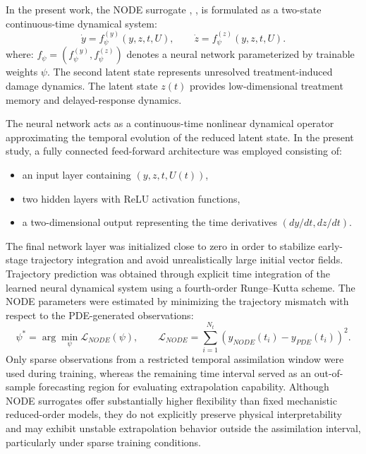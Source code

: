 In the present work, the NODE surrogate \cite{chen2018neural}, \cite{rackauckas2020ude}, \cite{rubanova2019latent} is formulated as a two-state
continuous-time dynamical system:
\begin{equation}
\label{eq:node}
\dot y=f_{\psi}^{(y)}(y,z,t,U),
\qquad
\dot z=f_{\psi}^{(z)}(y,z,t,U).
\end{equation}
where:
\(f_{\psi}=(f_{\psi}^{(y)},f_{\psi}^{(z)})\) denotes a neural network
parameterized by trainable weights \(\psi\). The second latent state represents unresolved treatment-induced damage dynamics.
The latent state $z(t)$ provides low-dimensional treatment memory and delayed-response dynamics.

The neural network acts as a continuous-time nonlinear dynamical
operator approximating the temporal evolution of the reduced latent
state. In the present study, a fully connected feed-forward
architecture was employed consisting of:
\begin{itemize}
\item
an input layer containing $(y,z,t,U(t))$,
\item
two hidden layers with ReLU activation functions,
\item
a two-dimensional output representing the time derivatives $(dy/dt,dz/dt)$.
\end{itemize}
The final network layer was initialized close to zero in order to
stabilize early-stage trajectory integration and avoid unrealistically
large initial vector fields. Trajectory prediction was obtained through explicit time integration of
the learned neural dynamical system using a fourth-order Runge--Kutta
scheme. The NODE parameters were estimated by minimizing the trajectory mismatch
with respect to the PDE-generated observations:
\begin{equation}
\label{eq:node_training}
\psi^{*}
=
\arg\min_{\psi}
\mathcal{L}_{NODE}(\psi),
\qquad
\mathcal{L}_{NODE}
=
\sum_{i=1}^{N_t}
\left(
y_{NODE}(t_i)
-
y_{PDE}(t_i)
\right)^2.
\end{equation}
Only sparse observations from a restricted temporal assimilation window
were used during training, whereas the remaining time interval served as
an out-of-sample forecasting region for evaluating extrapolation
capability.
Although NODE surrogates offer substantially higher flexibility than
fixed mechanistic reduced-order models, they do not explicitly preserve
physical interpretability and may exhibit unstable extrapolation
behavior outside the assimilation interval, particularly under sparse
training conditions.

